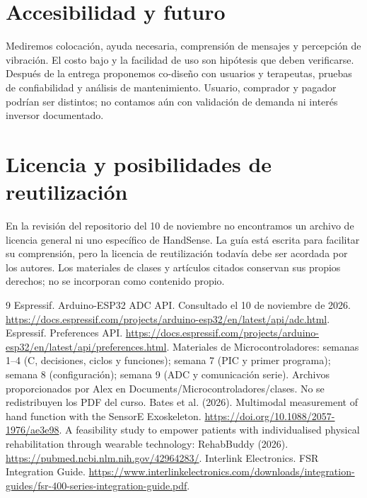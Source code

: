 \documentclass[11pt,a4paper]{article}
\begin{document}
\section{Accesibilidad y futuro}
Mediremos colocación, ayuda necesaria, comprensión de mensajes y percepción de vibración. El costo bajo y la facilidad de uso son hipótesis que deben verificarse. Después de la entrega proponemos co-diseño con usuarios y terapeutas, pruebas de confiabilidad y análisis de mantenimiento. Usuario, comprador y pagador podrían ser distintos; no contamos aún con validación de demanda ni interés inversor documentado.
\section{Licencia y posibilidades de reutilización}
En la revisión del repositorio del 10 de noviembre no encontramos un archivo de licencia general ni uno específico de HandSense. La guía está escrita para facilitar su comprensión, pero la licencia de reutilización todavía debe ser acordada por los autores. Los materiales de clases y artículos citados conservan sus propios derechos; no se incorporan como contenido propio.
\begin{thebibliography}{9}
 Espressif. Arduino-ESP32 ADC API. Consultado el 10 de noviembre de 2026. \url{https://docs.espressif.com/projects/arduino-esp32/en/latest/api/adc.html}.
 Espressif. Preferences API. \url{https://docs.espressif.com/projects/arduino-esp32/en/latest/api/preferences.html}.
 Materiales de Microcontroladores: semanas 1--4 (C, decisiones, ciclos y funciones); semana 7 (PIC y primer programa); semana 8 (configuración); semana 9 (ADC y comunicación serie). Archivos proporcionados por Alex en Documents/Microcontroladores/clases. No se redistribuyen los PDF del curso.
 Bates et al. (2026). Multimodal measurement of hand function with the SensorE Exoskeleton. \url{https://doi.org/10.1088/2057-1976/ae3e98}.
 A feasibility study to empower patients with individualised physical rehabilitation through wearable technology: RehabBuddy (2026). \url{https://pubmed.ncbi.nlm.nih.gov/42964283/}.
 Interlink Electronics. FSR Integration Guide. \url{https://www.interlinkelectronics.com/downloads/integration-guides/fsr-400-series-integration-guide.pdf}.
\end{thebibliography}
\end{document}
